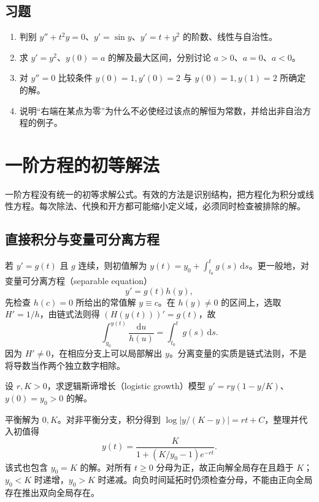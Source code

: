 \documentclass[UTF8,12pt,a4paper,fontset=fandol]{ctexbook}
\begin{document}
\section{习题}
\begin{enumerate}
 \item\label{ex:ode-classify} 判别 $y''+t^2y=0$、$y'=\sin y$、$y'=t+y^2$ 的阶数、线性与自治性。
 \item\label{ex:ode-square} 求 $y'=y^2$、$y(0)=a$ 的解及最大区间，分别讨论 $a>0$、$a=0$、$a<0$。
 \item\label{ex:ode-boundary-intro} 对 $y''=0$ 比较条件 $y(0)=1,y'(0)=2$ 与 $y(0)=1,y(1)=2$ 所确定的解。
 \item 说明“右端在某点为零”为什么不必使经过该点的解恒为常数，并给出非自治方程的例子。
\end{enumerate}

\chapter{一阶方程的初等解法}
\label{chap:ode-first-order}

一阶方程没有统一的初等求解公式。有效的方法是识别结构，把方程化为积分或线性方程。每次除法、代换和开方都可能缩小定义域，必须同时检查被排除的解。

\section{直接积分与变量可分离方程}
若 $y'=g(t)$ 且 $g$ 连续，则初值解为 $y(t)=y_0+\int_{t_0}^t g(s)\,\mathrm ds$。更一般地，对变量可分离方程（separable equation）
\[
 y'=g(t)h(y),
\]
先检查 $h(c)=0$ 所给出的常值解 $y\equiv c$。在 $h(y)\ne0$ 的区间上，选取 $H'=1/h$，由链式法则得 $(H(y(t)))'=g(t)$，故
\begin{equation}
 \int_{y_0}^{y(t)}\frac{\mathrm du}{h(u)}=\int_{t_0}^t g(s)\,\mathrm ds.
 \label{eq:ode-separable}
\end{equation}
因为 $H'\ne0$，在相应分支上可以局部解出 $y$。分离变量的实质是链式法则，不是将导数当作两个独立数字相除。

\begin{example}[Logistic 增长]
设 $r,K>0$，求逻辑斯谛增长（logistic growth）模型 $y'=ry(1-y/K)$、$y(0)=y_0>0$ 的解。
\end{example}
\begin{solve}
平衡解为 $0,K$。对非平衡分支，积分得到 $\log|y/(K-y)|=rt+C$，整理并代入初值得
\begin{equation}
 y(t)=\frac{K}{1+(K/y_0-1)e^{-rt}}.
 \label{eq:ode-logistic}
\end{equation}
该式也包含 $y_0=K$ 的解。对所有 $t\geq0$ 分母为正，故正向解全局存在且趋于 $K$；$y_0<K$ 时递增，$y_0>K$ 时递减。向负时间延拓时仍须检查分母，不能由正向全局存在推出双向全局存在。
\end{solve}
\end{document}
